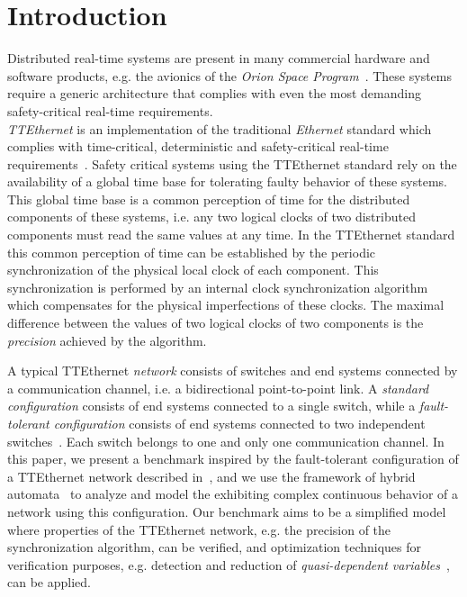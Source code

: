\section{Introduction}
\label{sec:intro}

Distributed real-time systems are present in many commercial hardware and software 
products, e.g. the avionics of the \emph{Orion Space Program}~\cite{Howard}. 
These systems require a generic architecture that complies with
even the most demanding safety-critical real-time requirements.\\ 
\emph{TTEthernet} is an implementation of the traditional \emph{Ethernet} standard
which complies with time-critical, deterministic and safety-critical real-time requirements~\cite{Kopetz}. 
Safety critical systems using the TTEthernet standard rely on the availability 
of a global time base for tolerating faulty behavior of these systems.  
This global time base is a common perception of time for the distributed components of these systems,  
i.e. any two logical clocks of two distributed components must read the same values at any time.
In the TTEthernet standard this common perception of time can be established by 
the periodic synchronization of the physical local clock of each component. 
This synchronization is performed by an internal clock synchronization algorithm~\cite{Kopetz} 
which compensates for the physical
imperfections of these clocks. The maximal difference between the values of 
two logical clocks of two components is the \emph{precision} achieved by the algorithm.

A typical TTEthernet \emph{network} consists of switches and end systems connected by a communication channel,
i.e. a bidirectional point-to-point link. A \emph{standard configuration} consists of end systems 
connected to a single switch, while a \emph{fault-tolerant configuration} consists of end systems 
connected to two independent switches~\cite{Kopetz}. 
Each switch belongs to one and only one communication channel. 
%
In this paper, we present a benchmark inspired by the fault-tolerant configuration 
of a TTEthernet network described in~\cite{Steiner2}, and we use the framework of
hybrid automata~\cite{Alur2,bogomolov-etal:spin2013,bogomolov-etal:cav2012-intro} to analyze and model the exhibiting complex continuous behavior
of a network using this configuration. Our benchmark aims to be a simplified model
where properties of the TTEthernet network, e.g. the precision of the synchronization algorithm, can be verified, and
optimization techniques for verification purposes, e.g. detection and 
reduction of \emph{quasi-dependent variables}~\cite{Herrera3}, can be applied. 

